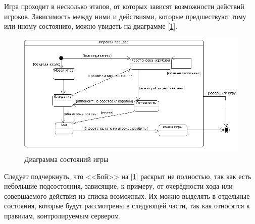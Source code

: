 Игра проходит в несколько этапов, от которых зависят возможности действий игроков. Зависимость между ними и действиями, которые предшествуют тому или иному состоянию, можно увидеть на диаграмме [\ref{fig12}].

\begin{figure}[ht]
\centering
\includegraphics[width=18cm]{images/statecl.png}
\caption{Диаграмма состояний игры}
\label{fig12}
\end{figure}


Следует подчеркнуть, что <<Бой>> на [\ref{fig12}] раскрыт не полностью, так как есть небольшие подсостояния, зависящие, к примеру, от очерёдности хода или совершаемого действия из списка возможных. Их можно выделять в отдельные состояния, которые будут рассмотрены в следующей части, так как относятся к правилам, контролируемым сервером. 
\endinput
